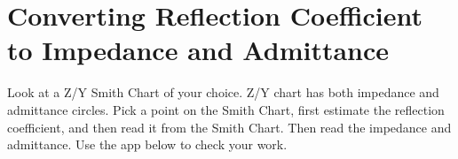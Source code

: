 \documentclass{ximera}
\begin{document}
\section{Converting Reflection Coefficient to Impedance and Admittance}

\begin{example}

Look at a Z/Y Smith Chart of your choice. Z/Y chart has both impedance and admittance circles. Pick a point on the Smith Chart, first estimate the reflection coefficient, and then read it from the Smith Chart. Then read the impedance and admittance. 
Use the app below to check your work.

\begin{center}  
\end{center} 
\end{example}
\end{document}
